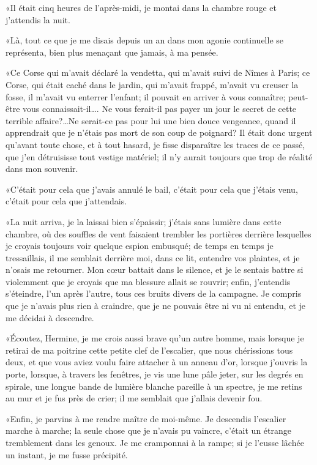 «Il était cinq heures de l'après-midi, je montai dans la chambre rouge et j'attendis la nuit. 

«Là, tout ce que je me disais depuis un an dans mon agonie continuelle se représenta, bien plus menaçant que jamais, à ma pensée. 

«Ce Corse qui m'avait déclaré la vendetta, qui m'avait suivi de Nîmes à Paris; ce Corse, qui était caché dans le jardin, qui m'avait frappé, m'avait vu creuser la fosse, il m'avait vu enterrer l'enfant; il pouvait en arriver à vous connaître; peut-être vous connaissait-il\dots. Ne vous ferait-il pas payer un jour le secret de cette terrible affaire?\dots Ne serait-ce pas pour lui une bien douce vengeance, quand il apprendrait que je n'étais pas mort de son coup de poignard? Il était donc urgent qu'avant toute chose, et à tout hasard, je fisse disparaître les traces de ce passé, que j'en détruisisse tout vestige matériel; il n'y aurait toujours que trop de réalité dans mon souvenir. 

«C'était pour cela que j'avais annulé le bail, c'était pour cela que j'étais venu, c'était pour cela que j'attendais. 

«La nuit arriva, je la laissai bien s'épaissir; j'étais sans lumière dans cette chambre, où des souffles de vent faisaient trembler les portières derrière lesquelles je croyais toujours voir quelque espion embusqué; de temps en temps je tressaillais, il me semblait derrière moi, dans ce lit, entendre vos plaintes, et je n'osais me retourner. Mon cœur battait dans le silence, et je le sentais battre si violemment que je croyais que ma blessure allait se rouvrir; enfin, j'entendis s'éteindre, l'un après l'autre, tous ces bruits divers de la campagne. Je compris que je n'avais plus rien à craindre, que je ne pouvais être ni vu ni entendu, et je me décidai à descendre. 

«Écoutez, Hermine, je me crois aussi brave qu'un autre homme, mais lorsque je retirai de ma poitrine cette petite clef de l'escalier, que nous chérissions tous deux, et que vous aviez voulu faire attacher à un anneau d'or, lorsque j'ouvris la porte, lorsque, à travers les fenêtres, je vis une lune pâle jeter, sur les degrés en spirale, une longue bande de lumière blanche pareille à un spectre, je me retins au mur et je fus près de crier; il me semblait que j'allais devenir fou. 

«Enfin, je parvins à me rendre maître de moi-même. Je descendis l'escalier marche à marche; la seule chose que je n'avais pu vaincre, c'était un étrange tremblement dans les genoux. Je me cramponnai à la rampe; si je l'eusse lâchée un instant, je me fusse précipité. 

